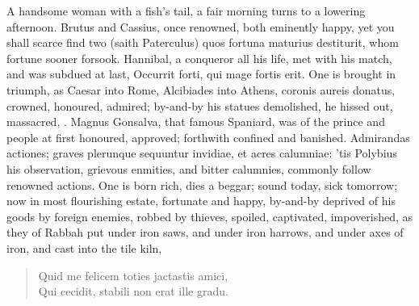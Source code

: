{{A handsome woman with a fish's tail, a fair morning turns to a lowering afternoon. Brutus and Cassius, once
renowned, both eminently happy, yet you shall scarce find two (saith
Paterculus) quos fortuna maturius destiturit, whom fortune sooner
forsook. Hannibal, a conqueror all his life, met with his match, and
was subdued at last, Occurrit forti, qui mage fortis erit. One is
brought in triumph, as Caesar into Rome, Alcibiades into Athens,
coronis aureis donatus, crowned, honoured, admired; by-and-by his
statues demolished, he hissed out, massacred, \etc{}. Magnus
Gonsalva, that famous Spaniard, was of the prince and people at first
honoured, approved; forthwith confined and banished. Admirandas
actiones; graves plerunque sequuntur invidiae, et acres calumniae: 'tis
Polybius his observation, grievous enmities, and bitter calumnies,
commonly follow renowned actions. One is born rich, dies a beggar;
sound today, sick tomorrow; now in most flourishing estate, fortunate
and happy, by-and-by deprived of his goods by foreign enemies, robbed
by thieves, spoiled, captivated, impoverished, as they of Rabbah
put under iron saws, and under iron harrows, and under axes of iron,
and cast into the tile kiln,

\begin{verse}
\textlatin{Quid me felicem toties jactastis amici},\\
\textlatin{Qui cecidit, stabili non erat ille gradu.}
\end{verse}

}}

